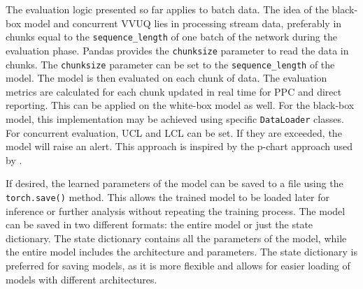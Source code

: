 The evaluation logic presented so far applies to batch data. The idea of the black-box model and concurrent VVUQ lies in processing stream data, preferably in chunks equal to the \texttt{sequence\_length} of one batch of the network during the evaluation phase. Pandas \autocite{Pandas} provides the \texttt{chunksize} parameter to read the data in chunks. The \texttt{chunksize} parameter can be set to the \texttt{sequence\_length} of the model. The model is then evaluated on each chunk of data. The evaluation metrics are calculated for each chunk updated in real time for PPC and direct reporting. This can be applied on the white-box model as well. For the black-box model, this implementation may be achieved using specific \texttt{DataLoader} classes. For concurrent evaluation, UCL and LCL can be set. If they are exceeded, the model will raise an alert. This approach is inspired by the p-chart approach used by \autocite{dos2024simulation}.

If desired, the learned parameters of the model can be saved to a file using the \texttt{torch.save()} method. This allows the trained model to be loaded later for inference or further analysis without repeating the training process. The model can be saved in two different formats: the entire model or just the state dictionary. The state dictionary contains all the parameters of the model, while the entire model includes the architecture and parameters. The state dictionary is preferred for saving models, as it is more flexible and allows for easier loading of models with different architectures.